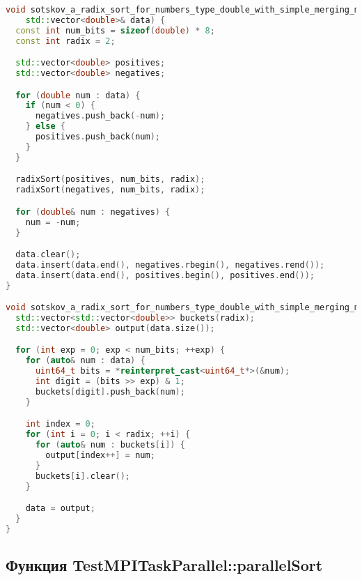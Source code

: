 \documentclass[12pt]{article}
\begin{document}
\begin{lstlisting}[language=C++]
void sotskov_a_radix_sort_for_numbers_type_double_with_simple_merging_mpi::radixSortWithSignHandling(
    std::vector<double>& data) {
  const int num_bits = sizeof(double) * 8;
  const int radix = 2;

  std::vector<double> positives;
  std::vector<double> negatives;

  for (double num : data) {
    if (num < 0) {
      negatives.push_back(-num);
    } else {
      positives.push_back(num);
    }
  }

  radixSort(positives, num_bits, radix);
  radixSort(negatives, num_bits, radix);

  for (double& num : negatives) {
    num = -num;
  }

  data.clear();
  data.insert(data.end(), negatives.rbegin(), negatives.rend());
  data.insert(data.end(), positives.begin(), positives.end());
}

void sotskov_a_radix_sort_for_numbers_type_double_with_simple_merging_mpi::radixSort(std::vector<double>& data, int num_bits, int radix) {
  std::vector<std::vector<double>> buckets(radix);
  std::vector<double> output(data.size());

  for (int exp = 0; exp < num_bits; ++exp) {
    for (auto& num : data) {
      uint64_t bits = *reinterpret_cast<uint64_t*>(&num);
      int digit = (bits >> exp) & 1;
      buckets[digit].push_back(num);
    }

    int index = 0;
    for (int i = 0; i < radix; ++i) {
      for (auto& num : buckets[i]) {
        output[index++] = num;
      }
      buckets[i].clear();
    }

    data = output;
  }
}
\end{lstlisting}

\subsection*{Функция TestMPITaskParallel::parallelSort}
\end{document}
